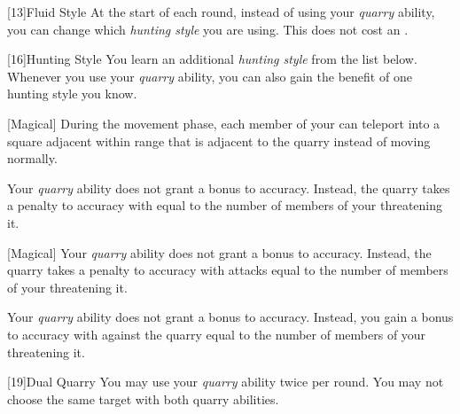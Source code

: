         [13]{Fluid Style}
        At the start of each round, instead of using your \textit{quarry} ability, you can change which \textit{hunting style} you are using.
        This does not cost an .

        [16]{Hunting Style}
        You learn an additional \textit{hunting style} from the list below.
        Whenever you use your \textit{quarry} ability, you can also gain the benefit of one hunting style you know.
        {
            [Magical]
            During the movement phase, each member of your  can teleport into a square adjacent within \rngmed range that is adjacent to the quarry instead of moving normally.

            Your \textit{quarry} ability does not grant a bonus to accuracy.
            Instead, the quarry takes a penalty to accuracy with  equal to the number of members of your  threatening it.

            [Magical]
            Your \textit{quarry} ability does not grant a bonus to accuracy.
            Instead, the quarry takes a penalty to accuracy with  attacks equal to the number of members of your  threatening it.

            Your \textit{quarry} ability does not grant a bonus to accuracy.
            Instead, you gain a bonus to accuracy with  against the quarry equal to the number of members of your  threatening it.
        }

        [19]{Dual Quarry} You may use your \textit{quarry} ability twice per round.
        You may not choose the same target with both quarry abilities.

